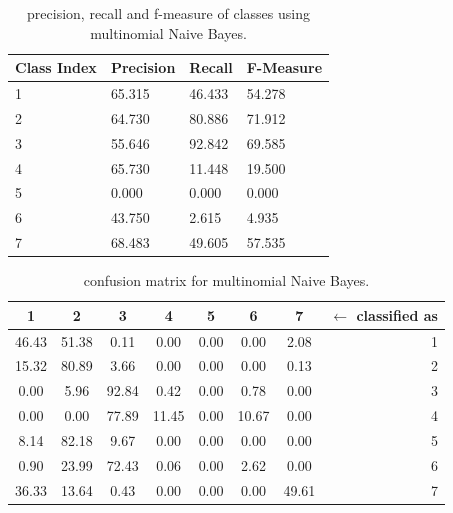 \documentclass[a4paper, 10pt]{article}
\begin{document}
\begin{table}[H]
\centering
\begin{tabular}{|l|l|l|l|}
\hline
\textbf{Class Index} & \textbf{Precision} & \textbf{Recall} & \textbf{F-Measure}\\\hline
1 & 65.315 & 46.433& 54.278\\\hline
2 & 64.730 & 80.886& 71.912\\\hline
3 & 55.646 & 92.842& 69.585\\\hline
4 & 65.730 & 11.448& 19.500\\\hline
5 & 0.000 & 0.000& 0.000\\\hline
6 & 43.750 & 2.615& 4.935\\\hline
7 & 68.483 & 49.605& 57.535\\\hline
\end{tabular}
\caption{precision, recall and f-measure of classes using multinomial Naive Bayes.}
\label{tab:mnb_test_pr}
\end{table}


\begin{table}[H]
\centering
\begin{tabular}{|*{7}{c|}r|}
\hline

1 &2 &3 &4 &5 &6 &7 & $\leftarrow$ classified as \\\hline

\cellcolor{black!15}46.43 &51.38 &0.11 &0.00 &0.00 &0.00 &2.08 & 1 \\\hline

15.32 &\cellcolor{black!15}80.89 &3.66 &0.00 &0.00 &0.00 &0.13 & 2 \\\hline

0.00 &5.96 &\cellcolor{black!15}92.84 &0.42 &0.00 &0.78 &0.00 & 3 \\\hline

0.00 &0.00 &77.89 &\cellcolor{black!15}11.45 &0.00 &10.67 &0.00 & 4 \\\hline

8.14 &82.18 &9.67 &0.00 &\cellcolor{black!15}0.00 &0.00 &0.00 & 5 \\\hline

0.90 &23.99 &72.43 &0.06 &0.00 &\cellcolor{black!15}2.62 &0.00 & 6 \\\hline

36.33 &13.64 &0.43 &0.00 &0.00 &0.00 &\cellcolor{black!15}49.61 & 7 \\\hline

\end{tabular}
\caption{confusion matrix for multinomial Naive Bayes.}
\label{tab:mnb_cf}
\end{table}
\end{document}
